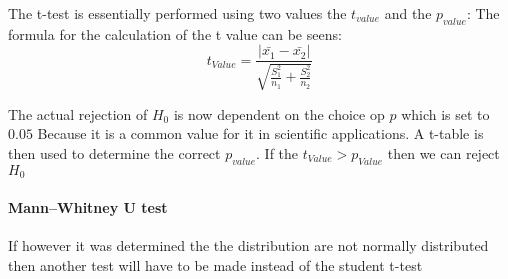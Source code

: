 The t-test is essentially performed using two values the $t_{value}$ and the $p_{value}$:
The formula for the calculation of the t value can be seens:
$$t_{Value} = \frac{|\bar{x_1}- \bar{x_2}|}{\sqrt{\frac{S_1^2}{n_1} + \frac{S_2^2}{n_2}}}$$ 

The actual rejection of $H_0$ is now dependent on the choice op $p$ which is set to $0.05$ Because it is a common value for it in scientific applications. A t-table is then used to determine the correct $p_{value}$.
If the $t_{Value} > p_{Value}$ then we can reject $H_0$

\paragraph{Mann–Whitney U test}
If however it was determined the the distribution are not normally distributed then another test will have to be made instead of the student t-test